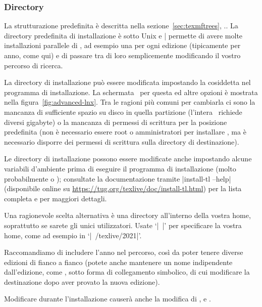 \documentclass{article}
\begin{document}
\subsubsection{Directory}
\label{sec:directories}

La strutturazione predefinita è descritta nella
sezione~\ref{sec:texmftrees}, \p.\pageref{sec:texmftrees}. La directory
predefinita di installazione è
 sotto
Unix e |%
permette di avere molte installazioni parallele di \TL, ad esempio una per
ogni edizione (tipicamente per anno, come qui) e di passare tra di loro
semplicemente modificando il vostro percorso di ricerca.

La directory di installazione può essere modificata impostando la
cosiddetta  nel programma di installazione. La schermata
\GUI\ per questa ed altre opzioni è mostrata nella
figura~\ref{fig:advanced-lnx}. Tra le ragioni più comuni per cambiarla ci sono
la mancanza di sufficiente spazio su disco in quella partizione (l'intera
\TL\ richiede diversi gigabyte) o la mancanza di permessi di scrittura per
la posizione predefinita (non è necessario essere root o amministratori
per installare \TL, ma è necessario disporre dei permessi di scrittura sulla
directory di destinazione).

Le directory di installazione possono essere modificate anche impostando
alcune variabili d'ambiente prima di eseguire il programma di
installazione (molto probabilmente  o
); consultate la documentazione tramite
|install-tl --help| (disponibile online su
\url{https://tug.org/texlive/doc/install-tl.html}) per la lista completa e
per maggiori dettagli.

Una ragionevole scelta alternativa è una directory all'interno della
vostra home, soprattutto se sarete gli unici utilizzatori. Usate `|~|'
per specificare la vostra home, come ad esempio in `|~/texlive/2021|'.

Raccomandiamo di includere l'anno nel percorso, così da poter tenere
diverse edizioni di \TL{} fianco a fianco (potete anche mantenere un nome
indipendente dall'edizione, come , sotto
forma di collegamento simbolico, di cui modificare la destinazione dopo
aver provato la nuova edizione).

Modificare  durante l'installazione causerà anche la
modifica di ,  e
.
\end{document}
